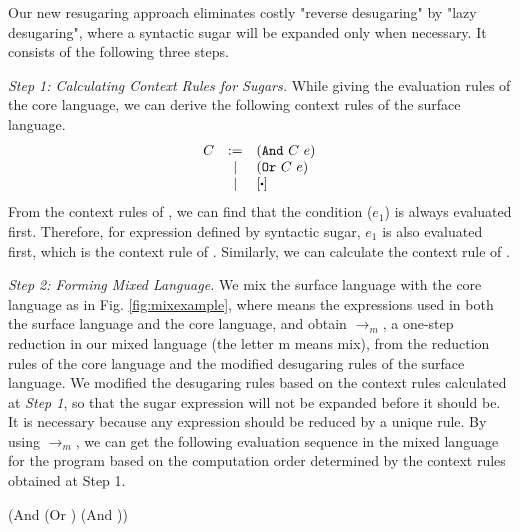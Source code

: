 Our new resugaring approach eliminates costly "reverse desugaring" by "lazy desugaring", where a syntactic sugar will be expanded only when necessary. It consists of the following three steps.

{\em Step 1: Calculating Context Rules for Sugars.}
While giving the evaluation rules of the core language, we can derive the following context rules of the surface language.
\[
\begin{array}{lcl}
C &:=& (\m{And}~C~e)\\
&|& (\m{Or}~C~e)\\
&|&[\bigcdot]\\
\end{array}
\]
From the context rules of , we can find that the condition ($e_1$) is always evaluated first. Therefore, for expression  defined by syntactic sugar, $e_1$ is also evaluated first, which is the context rule of . Similarly, we can calculate the context rule of .

{\em Step 2: Forming Mixed Language.}
We mix the surface language with the core language as in Fig. \ref{fig:mixexample}, where  means the expressions used in both the surface language and the core language, and obtain $\to_m$, a one-step reduction in our mixed language (the letter m means mix), from the reduction rules of the core language and the modified desugaring rules of the surface language. We modified the desugaring rules based on the context rules calculated at {\em Step 1}, so that the sugar expression will not be expanded before it should be. It is necessary because any expression should be reduced by a unique rule. By using $\to_m$, we can get the following evaluation sequence in the mixed language for
the program  based on the computation order determined by the context rules obtained at Step 1.

{\footnotesize
\begin{Codes}
    (And (Or \true \false) (And \false \true))
\OneStep{ \false}
\end{Codes}
}


